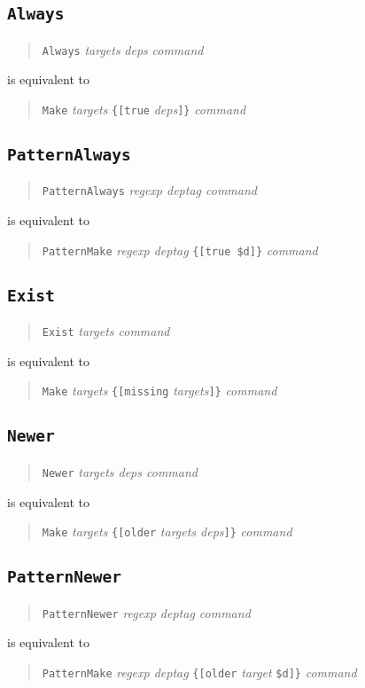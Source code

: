 \documentclass[11pt,bibtotoc,idxtotoc]{scrreprt}
\begin{document}
\subsection{\texttt{Always}}
\begin{quote}
  \texttt{Always} \textit{targets} \textit{deps }\textit{command}
\end{quote}
is equivalent to
\begin{quote}
  \texttt{Make} \textit{targets} 
   \texttt{\{[true} \textit{deps}\texttt{]\}} \textit{command}
\end{quote}

\subsection{\texttt{PatternAlways}}
\begin{quote}
  \texttt{PatternAlways} \textit{regexp deptag command}
\end{quote}
is equivalent to
\begin{quote}
  \texttt{PatternMake} \textit{regexp deptag}
  \texttt{\{[true \$d]\}} \textit{command}
\end{quote}

\subsection{\texttt{Exist}}
\begin{quote}
  \texttt{Exist} \textit{targets command}
\end{quote}
is equivalent to
\begin{quote}
  \texttt{Make} \textit{targets}
  \texttt{\{[missing} \textit{targets}\texttt{]\}} \textit{command}
\end{quote}

\subsection{\texttt{Newer}}
\begin{quote}
  \texttt{Newer} \textit{targets deps command}
\end{quote}
is equivalent to
\begin{quote}
  \texttt{Make} \textit{targets} 
  \texttt{\{[older} \textit{targets deps}\texttt{]\}} \textit{command}
\end{quote}

\subsection{\texttt{PatternNewer}}
\begin{quote}
  \texttt{PatternNewer} \textit{regexp deptag command}
\end{quote}
is equivalent to
\begin{quote}
  \texttt{PatternMake} \textit{regexp deptag}
  \texttt{\{[older} \textit{target} \texttt{\$d]\}} \textit{command}
\end{quote}
\end{document}
